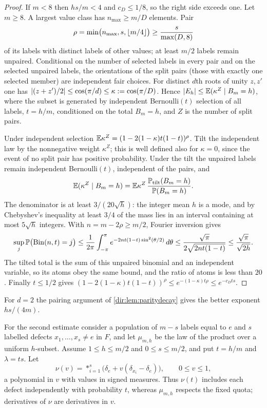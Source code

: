 \begin{proof}
If $m<8$ then $hs/m<4$ and $c_D\le1/8$, so the right side exceeds one. Let $m\ge8$. A largest value
class has $n_{\max}\ge m/D$ elements. Pair
\[
 \rho=\min\bigl(n_{\max},s,\lfloor m/4\rfloor\bigr)\ge\frac s{\max(D,8)}
\]
of its labels with distinct labels of other values; at least $m/2$ labels remain unpaired. Conditional on
the number of selected labels in every pair and on the selected unpaired labels, the orientations of the
split pairs (those with exactly one selected member) are independent fair choices. For distinct $d$th
roots of unity $z,z'$ one has $\lvert(z+z')/2\rvert\le\cos(\pi/d)\le\kappa:=\cos(\pi/D)$. Hence
$\lvert E_h\rvert\le\mathbb{E}(\kappa^Z\mid B_m=h)$, where the subset is generated by independent Bernoulli$(t)$
selection of all labels, $t=h/m$, conditioned on the total $B_m=h$, and $Z$ is the number of split pairs.

Under independent selection $\mathbb{E}\kappa^Z=(1-2(1-\kappa)t(1-t))^\rho$. Tilt the independent law by the
nonnegative weight $\kappa^Z$; this is well defined also for $\kappa=0$, since the event of no split pair
has positive probability. Under the tilt the unpaired labels remain independent Bernoulli$(t)$,
independent of the pairs, and
\[
 \mathbb{E}(\kappa^Z\mid B_m=h)=\mathbb{E}\kappa^Z\,\frac{\mathbb{P}_{\mathrm{tilt}}(B_m=h)}{\mathbb{P}(B_m=h)} .
\]
The denominator is at least $3/(20\sqrt h)$: the integer mean $h$ is a mode, and by Chebyshev's inequality
at least $3/4$ of the mass lies in an interval containing at most $5\sqrt h$ integers. With
$n=m-2\rho\ge m/2$, Fourier inversion gives
\[
 \sup_j\mathbb{P}\bigl(\mathrm{Bin}(n,t)=j\bigr)\le\frac1{2\pi}\int_{-\pi}^{\pi}e^{-2nt(1-t)\sin^2(\theta/2)}\,d\theta
 \le\frac{\sqrt\pi}{2\sqrt{2nt(1-t)}}\le\frac{\sqrt\pi}{\sqrt{2h}} .
\]
The tilted total is the sum of this unpaired binomial and an independent variable, so its atoms obey the
same bound, and the ratio of atoms is less than $20$. Finally $t\le1/2$ gives
$(1-2(1-\kappa)t(1-t))^\rho\le e^{-(1-\kappa)t\rho}\le e^{-c_Dts}$.
\end{proof}

For $d=2$ the pairing argument of \cref{dir:lem:paritydecay} gives the better exponent $hs/(4m)$.

For the second estimate consider a population of $m-s$ labels equal to $e$ and $s$ labelled defects
$x_1,\dots,x_s\ne e$ in $F$, and let $\mu_{m,h}$ be the law of the product over a uniform $h$-subset.
Assume $1\le h\le m/2$ and $0\le s\le m/2$, and put $t=h/m$ and $\lambda=ts$. Let
\begin{equation}\label{dir:eq:nu}
 \nu(v)=\mathop{\ast}_{i=1}^s\bigl(\delta_e+v(\delta_{x_i}-\delta_e)\bigr),\qquad0\le v\le1,
\end{equation}
a polynomial in $v$ with values in signed measures. Thus $\nu(t)$ includes each defect independently with
probability $t$, whereas $\mu_{m,h}$ respects the fixed quota; derivatives of $\nu$ are derivatives in $v$.

